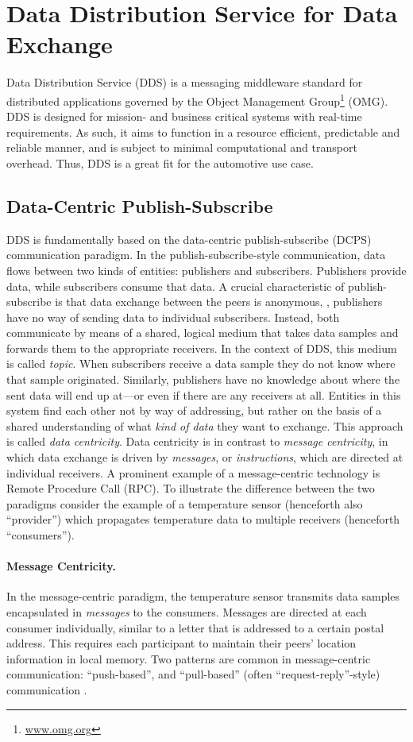 \section{Data Distribution Service for Data Exchange}
Data Distribution Service (DDS) is a messaging middleware standard \cite{dds-1.4-standard} for distributed applications governed by the Object Management Group\footnote{\url{www.omg.org}} (OMG). DDS is designed for mission- and business critical systems with real-time requirements. As such, it aims to function in a resource efficient, predictable and reliable manner, and is subject to minimal computational and transport overhead.
Thus, DDS is a great fit for the automotive use case. 

\subsection{Data-Centric Publish-Subscribe}
DDS is fundamentally based on the data-centric publish-subscribe (DCPS) communication paradigm. In the publish-subscribe-style communication, data flows between two kinds of entities: publishers and subscribers. Publishers provide data, while subscribers consume that data. A crucial characteristic of publish-subscribe is that data exchange between the peers is anonymous, \ie , publishers have no way of sending data to individual subscribers. Instead, both communicate by means of a shared, logical medium that takes data samples and forwards them to the appropriate receivers. In the context of DDS, this medium is called \emph{topic}. When subscribers receive a data sample they do not know where that sample originated. Similarly, publishers have no knowledge about where the sent data will end up at---or even if there are any receivers at all. Entities in this system find each other not by way of addressing, but rather on the basis of a shared understanding of what \emph{kind of data} they want to exchange. This approach is called \emph{data centricity}. Data centricity is in contrast to \emph{message centricity}, in which data exchange is driven by \emph{messages}, or \emph{instructions}, which are directed at individual receivers. A prominent example of a message-centric technology is Remote Procedure Call (RPC). To illustrate the difference between the two paradigms consider the example of a temperature sensor (henceforth also ``provider'') which propagates temperature data to multiple receivers (henceforth ``consumers'').

\paragraph{Message Centricity.} In the message-centric paradigm, the temperature sensor transmits data samples encapsulated in \emph{messages} to the consumers. Messages are directed at each consumer individually, similar to a letter that is addressed to a certain postal address. This requires each participant to maintain their peers' location information in local memory.
Two patterns are common in message-centric communication: ``push-based'', and ``pull-based'' (often ``request-reply''-style) communication \cite{tanenbaum2017distributed}.

